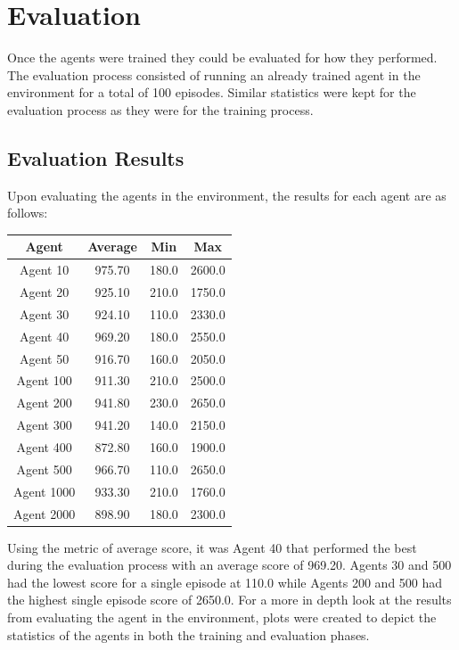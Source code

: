 \documentclass[
	a4paper, %
	10pt, %
	unnumberedsections, %
	twoside, %
]{LTJournalArticle}
\begin{document}
\section{Evaluation}

Once the agents were trained they could be evaluated for how they performed. The evaluation process consisted of running an already trained agent in the environment for a total of 100 episodes. Similar statistics
were kept for the evaluation process as they were for the training process.

\subsection{Evaluation Results}

Upon evaluating the agents in the environment, the results for each agent are as follows:

\begin{center}
	\begin{tabular}[ht]{|c|c|c|c|}
		\hline \textbf{Agent} & \textbf{Average} & \textbf{Min} & \textbf{Max} \\ \hline
		Agent 10 & 975.70 & 180.0 & 2600.0 \\ \hline
		Agent 20 & 925.10 & 210.0 & 1750.0 \\ \hline
		Agent 30 & 924.10 & 110.0 & 2330.0 \\ \hline
		Agent 40 & 969.20 & 180.0 & 2550.0 \\ \hline
		Agent 50 & 916.70 & 160.0 & 2050.0 \\ \hline
		Agent 100 & 911.30 & 210.0 & 2500.0 \\ \hline
		Agent 200 & 941.80 & 230.0 & 2650.0 \\ \hline
		Agent 300 & 941.20 & 140.0 & 2150.0 \\ \hline
		Agent 400 & 872.80 & 160.0 & 1900.0 \\ \hline
		Agent 500 & 966.70 & 110.0 & 2650.0 \\ \hline
		Agent 1000 & 933.30 & 210.0 & 1760.0 \\ \hline
		Agent 2000 & 898.90 & 180.0 & 2300.0 \\ \hline
	\end{tabular}
\end{center}

Using the metric of average score, it was Agent 40 that performed the best during the evaluation process with an average score of 969.20. Agents 30 and 500 had the lowest score for a single episode at 
110.0 while Agents 200 and 500 had the highest single episode score of 2650.0. For a more in depth look at the results from evaluating the agent in the environment, plots were created to depict the statistics
of the agents in both the training and evaluation phases.
\end{document}
